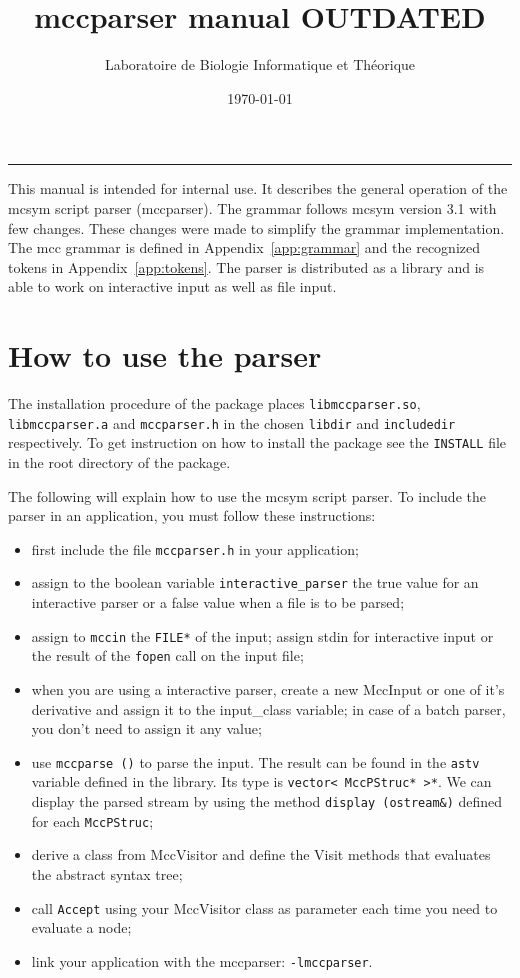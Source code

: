 \documentclass[11pt]{article}
\title{{\sc mccparser} manual OUTDATED}
\author{Laboratoire de Biologie Informatique et Théorique}
\date{\today}
\begin{document}
\maketitle

{\parindent 0pt \rule{\textwidth}{.5mm}}

\vspace{20pt}


This manual is intended for internal use.  It describes the general
operation of the {\sc mcsym} script parser ({\sc mccparser}).  The grammar
follows {\sc mcsym} version 3.1 with few changes.  These changes were made
to simplify the grammar implementation.  The mcc grammar is defined in
Appendix~\ref{app:grammar} and the recognized tokens in
Appendix~\ref{app:tokens}.  The parser is distributed as a library and is
able to work on interactive input as well as file input.

\section{How to use the parser}

The installation procedure of the package places {\tt libmccparser.so},
{\tt libmccparser.a} and {\tt mccparser.h} in the chosen {\tt libdir} and
{\tt includedir} respectively.  To get instruction on how to install the
package see the {\tt INSTALL} file in the root directory of the package.

\noindent The following will explain how to use the mcsym script parser.
To include the parser in an application, you must follow these instructions:
\begin{itemize}
\item first include the file {\tt mccparser.h} in your application;
\item assign to the boolean variable {\tt interactive\_parser} the true
  value for an interactive parser or a false value when a file is to be
  parsed;
\item assign to {\tt mccin} the {\tt FILE*} of the input; assign stdin for
  interactive input or the result of the {\tt fopen} call on the input file;
\item when you are using a interactive parser, create a new MccInput or one
  of it's derivative and assign it to the input\_class variable; in case of
  a batch parser, you don't need to assign it any value;
\item use {\tt mccparse ()} to parse the input.  The result can be found
  in the {\tt astv} variable defined in the library.  Its type is
  \verb+vector< MccPStruc* >*+.  We can display the parsed stream by using
  the method {\tt display (ostream\&)} defined for each {\tt MccPStruc};
\item derive a class from MccVisitor and define the Visit methods that
  evaluates the abstract syntax tree;
\item call {\tt Accept} using your MccVisitor class as parameter each time
  you need to evaluate a node;
\item link your application with the mccparser: {\tt -lmccparser}.
\end{itemize}
\end{document}
